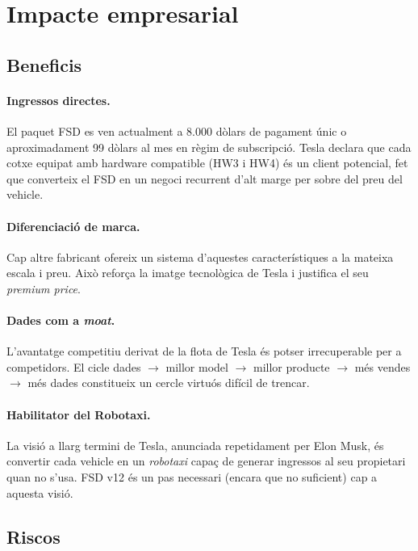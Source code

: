 \documentclass[11pt,a4paper]{article}
\begin{document}
\section{Impacte empresarial}

\subsection{Beneficis}

\paragraph{Ingressos directes.} El paquet FSD es ven actualment a 8.000 dòlars de pagament únic o aproximadament 99 dòlars al mes en règim de subscripció. Tesla declara que cada cotxe equipat amb hardware compatible (HW3 i HW4) és un client potencial, fet que converteix el FSD en un negoci recurrent d'alt marge per sobre del preu del vehicle.

\paragraph{Diferenciació de marca.} Cap altre fabricant ofereix un sistema d'aquestes característiques a la mateixa escala i preu. Això reforça la imatge tecnològica de Tesla i justifica el seu \emph{premium price}.

\paragraph{Dades com a \emph{moat}.} L'avantatge competitiu derivat de la flota de Tesla és potser irrecuperable per a competidors. El cicle dades $\rightarrow$ millor model $\rightarrow$ millor producte $\rightarrow$ més vendes $\rightarrow$ més dades constitueix un cercle virtuós difícil de trencar.

\paragraph{Habilitator del Robotaxi.} La visió a llarg termini de Tesla, anunciada repetidament per Elon Musk, és convertir cada vehicle en un \emph{robotaxi} capaç de generar ingressos al seu propietari quan no s'usa. FSD v12 és un pas necessari (encara que no suficient) cap a aquesta visió.

\subsection{Riscos}
\end{document}
